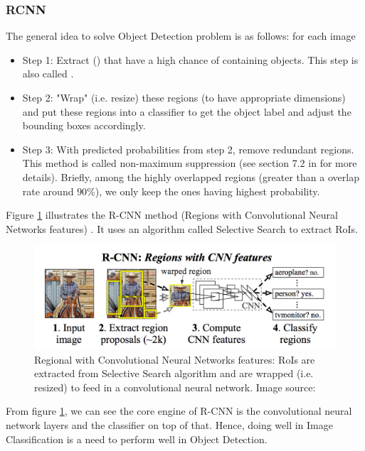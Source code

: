 \subsubsection{RCNN}
The general idea to solve Object Detection problem is as follows: for each image
\begin{itemize}
	\item Step 1: Extract  () that have a high chance of containing objects. This step is also called .
	\item Step 2: "Wrap" (i.e. resize) these regions (to have appropriate dimensions) and put these regions into a classifier to get the object label and adjust the bounding boxes accordingly.
	\item Step 3: With predicted probabilities from step 2, remove redundant regions. This method is called non-maximum suppression (see section 7.2 in \cite{Felzenszwalb:2010:ODD:1850486.1850574} for more details). Briefly, among the highly overlapped regions (greater than a overlap rate around $90\%$), we only keep the ones having highest probability.
\end{itemize}

Figure \ref{fig:rcnn} illustrates the R-CNN method (Regions with Convolutional Neural Networks features) \cite{DBLP:journals/corr/GirshickDDM13}. It uses an algorithm called Selective Search \cite{Uijlings:2013:SSO:2509349.2509382} to extract RoIs.
\begin{figure}[tb]
	\centering
	\includegraphics[width=1.0\hsize]{./figures/rcnn}
	\caption{Regional with Convolutional Neural Networks features: RoIs are extracted from Selective Search algorithm \cite{Uijlings:2013:SSO:2509349.2509382} and are wrapped (i.e. resized) to feed in a convolutional neural network. Image source: \cite{DBLP:journals/corr/GirshickDDM13}}
	\label{fig:rcnn}
\end{figure}
From figure \ref{fig:rcnn}, we can see the core engine of R-CNN is the convolutional neural network layers and the classifier on top of that. Hence, doing well in Image Classification is a need to perform well in Object Detection.

